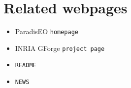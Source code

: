 \section{Related webpages}\label{webpages}
\begin{itemize}
\item Paradis\-EO {\tt homepage}\item INRIA GForge {\tt project page}\item {\tt README}\item {\tt NEWS} \end{itemize}
